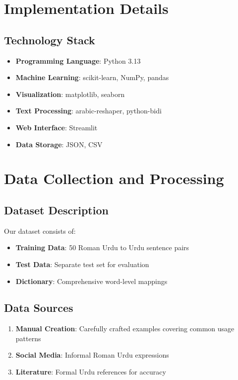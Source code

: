 \documentclass[10pt,twocolumn]{article}
\begin{document}
\section{Implementation Details}

\subsection{Technology Stack}
\begin{itemize}[leftmargin=*,noitemsep,topsep=0pt,parsep=0pt,partopsep=0pt]
    \item \textbf{Programming Language}: Python 3.13
    \item \textbf{Machine Learning}: scikit-learn, NumPy, pandas
    \item \textbf{Visualization}: matplotlib, seaborn
    \item \textbf{Text Processing}: arabic-reshaper, python-bidi
    \item \textbf{Web Interface}: Streamlit
    \item \textbf{Data Storage}: JSON, CSV
\end{itemize}

\section{Data Collection and Processing}

\subsection{Dataset Description}
Our dataset consists of:
\begin{itemize}[leftmargin=*,noitemsep,topsep=0pt,parsep=0pt,partopsep=0pt]
    \item \textbf{Training Data}: 50 Roman Urdu to Urdu sentence pairs
    \item \textbf{Test Data}: Separate test set for evaluation
    \item \textbf{Dictionary}: Comprehensive word-level mappings
\end{itemize}

\subsection{Data Sources}
\begin{enumerate}[label=\arabic*.]
    \item \textbf{Manual Creation}: Carefully crafted examples covering common usage patterns
    \item \textbf{Social Media}: Informal Roman Urdu expressions
    \item \textbf{Literature}: Formal Urdu references for accuracy
\end{enumerate}
\end{document}
